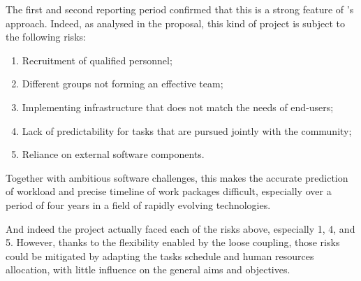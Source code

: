 The first and second reporting period confirmed that this is a strong
feature of \ODK's approach. Indeed, as analysed in the proposal, this
kind of project is subject to the following risks:
\begin{enumerate}
\item Recruitment of qualified personnel;
\item Different groups not forming an effective team;
\item Implementing infrastructure that does not match the needs of end-users;
\item Lack of predictability for tasks that are pursued jointly with
  the community;
\item Reliance on external software components.
\end{enumerate}
Together with ambitious software challenges, this makes the accurate
prediction of workload and precise timeline of work packages
difficult, especially over a period of four years in a field of
rapidly evolving technologies.

And indeed the project actually faced each of the risks above,
especially 1, 4, and 5. However, thanks to the flexibility enabled by
the loose coupling, those risks could be mitigated by adapting the
tasks schedule and human resources allocation, with little influence
on the general aims and objectives.


